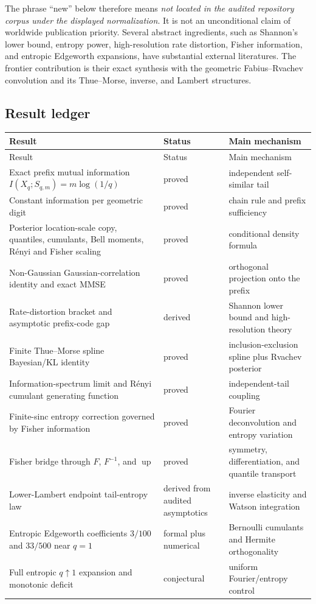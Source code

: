 \documentclass[11pt,oneside]{article}
\theoremstyle{definition}
\theoremstyle{remark}
\newcommand{\Up}{\operatorname{up}}
\begin{document}
The phrase ``new'' below therefore means \emph{not located in the audited repository
corpus under the displayed normalization}.  It is not an unconditional claim of
worldwide publication priority.  Several abstract ingredients, such as Shannon's
lower bound, entropy power, high-resolution rate distortion, Fisher information,
and entropic Edgeworth expansions, have substantial external literatures.  The
frontier contribution is their exact synthesis with the geometric Fabius--Rvachev
convolution and its Thue--Morse, inverse, and Lambert structures.

\subsection{Result ledger}

\begin{longtable}{@{}p{}p{}p{}@{}}
\toprule
Result & Status & Main mechanism \\
\midrule
\endfirsthead
\toprule
Result & Status & Main mechanism \\
\midrule
\endhead
Exact prefix mutual information $I(X_q;S_{q,m})=m\log(1/q)$ & proved & independent self-similar tail \\
Constant information per geometric digit & proved & chain rule and prefix sufficiency \\
Posterior location-scale copy, quantiles, cumulants, Bell moments, R\'enyi and Fisher scaling & proved & conditional density formula \\
Non-Gaussian Gaussian-correlation identity and exact MMSE & proved & orthogonal projection onto the prefix \\
Rate-distortion bracket and asymptotic prefix-code gap & derived & Shannon lower bound and high-resolution theory \\
Finite Thue--Morse spline Bayesian/KL identity & proved & inclusion-exclusion spline plus Rvachev posterior \\
Information-spectrum limit and R\'enyi cumulant generating function & proved & independent-tail coupling \\
Finite-sinc entropy correction governed by Fisher information & proved & Fourier deconvolution and entropy variation \\
Fisher bridge through $F$, $F^{-1}$, and $\Up$ & proved & symmetry, differentiation, and quantile transport \\
Lower-Lambert endpoint tail-entropy law & derived from audited asymptotics & inverse elasticity and Watson integration \\
Entropic Edgeworth coefficients $3/100$ and $33/500$ near $q=1$ & formal plus numerical & Bernoulli cumulants and Hermite orthogonality \\
Full entropic $q\uparrow1$ expansion and monotonic deficit & conjectural & uniform Fourier/entropy control \\
\bottomrule
\end{longtable}
\end{document}
